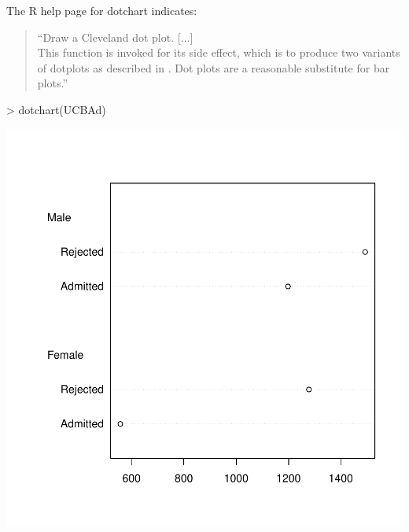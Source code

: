 \documentclass[12pt,letterpaper,final]{article}
\begin{document}
The R help page for dotchart indicates:
\begin{quotation}
``Draw a Cleveland dot plot. [$\ldots$] \\
This function is invoked for its side effect, which is to produce two variants 
of dotplots as described in \cite{Cle85}. 
Dot plots are a reasonable substitute for bar plots.''
\end{quotation}


\begin{Schunk}
\begin{Sinput}
> dotchart(UCBAd)
\end{Sinput}
\end{Schunk}
\includegraphics{lect_main-024}
\end{document}
